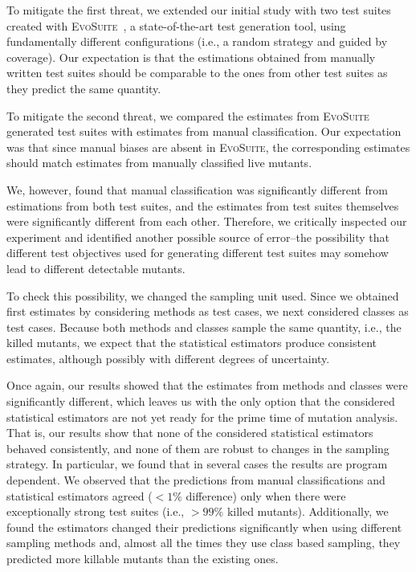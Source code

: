 \documentclass[sigconf,review,anonymous]{acmart}
\newcommand{\Evosuite}{\textsc{EvoSuite}\xspace}
\begin{document}
To mitigate the first threat, we extended our initial study with two test suites created with
\Evosuite~\cite{fraser2011evosuite}, a state-of-the-art test generation tool,
using fundamentally different configurations (i.e., a random strategy and guided by coverage).
Our expectation is that the estimations obtained from manually written test suites
should be comparable to the ones from other test suites
as they predict the same quantity.

To mitigate the second threat, we compared the estimates from \Evosuite
generated test suites with estimates from manual classification. Our expectation
was that since manual biases are absent in \Evosuite, the corresponding estimates
should match estimates from manually classified live mutants.

We, however, found that manual classification was significantly different from
estimations from both test suites, and the estimates from test suites themselves
were significantly different from each other.
Therefore, we critically inspected our experiment and identified another
possible source of error--the possibility that different test objectives
used for generating different test suites may somehow lead to different
detectable mutants.

To check this possibility, we changed the sampling unit used.
Since we obtained first estimates by
considering methods as test cases, we next
considered classes as test cases.
Because both methods and classes sample the same quantity, i.e., the killed mutants,
we expect that the statistical estimators produce consistent estimates, although
possibly with different degrees of uncertainty.

Once again, our results showed that the estimates from methods and classes were
significantly different, which leaves us with the only option that the considered statistical
estimators are not yet ready for the prime time of mutation analysis.
That is, our results show that none of the considered statistical estimators
behaved consistently, and none of them are robust to changes in the sampling
strategy.
In particular, we found that in several cases the results are program dependent.
We observed that the predictions from manual classifications and
statistical estimators agreed ($<1\%$ difference) only when there were
exceptionally strong test suites (i.e., $>99\%$ killed mutants).
Additionally, we found the estimators changed their predictions significantly
when using different sampling methods and, almost all the times they use class based sampling,
they predicted more killable mutants than the existing ones.
\end{document}
